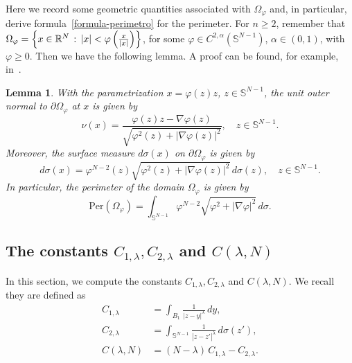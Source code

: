 \documentclass[10pt,reqno,english]{amsart}
\newcommand{\Sn}{\mathbb{S}^{N-1}}
\newcommand{\R} {\mathbb R}
\newtheorem{lemma}{Lemma}[section]
\theoremstyle{definition}
\numberwithin{equation}{section}
\begin{document}
Here we record some geometric quantities associated with $\Omega_\varphi$ and, in particular, derive formula~\eqref{formula-perimetro} for the perimeter. For $n\ge2$, remember that $\Omega_\varphi = \left\{ x \in \R^N \, : \, |x| < \varphi \left( {x \over |x|} \right) \right\}$, for some $\varphi \in C^{2, \alpha } (\mathbb S^{N-1})$, $\alpha \in (0,1)$, with $\varphi \geq 0$. Then we have the following lemma.
A proof can be found, for example, in~\cite[Proposition 4.1]{CFW}.

\begin{lemma}
\label{lemma:per}
 With the parametrization $x=\varphi(z)z$, $z\in\Sn$, the unit outer normal to $\partial\Omega_\varphi$ at $x$ is given by
 \[
 \nu(x)=\frac{\varphi(z)z-\nabla\varphi(z)}{ \sqrt{\varphi^2(z) + |\nabla \varphi(z) |^2} },\quad z\in\Sn.
 \]
 Moreover, the surface measure $d\sigma(x)$ on $\partial\Omega_\varphi$ is given by
 \[
 d\sigma(x)=\varphi^{N-2}(z) \sqrt{\varphi^2(z) + |\nabla \varphi(z) |^2} \, d\sigma(z),\quad z\in\Sn.
 \]
 In particular, the perimeter of the domain $\Omega_\varphi$ is given by
\[
{\mathrm{Per}} (\Omega_{\varphi })=\int_{\mathbb S^{N-1}} \varphi^{N-2} \sqrt{\varphi^2 + |\nabla \varphi |^2} \, d\sigma.
\]
\end{lemma}






\subsection{The constants \texorpdfstring{$C_{1,\lambda}, C_{2,\lambda}$ and $C(\lambda,N)$}{C1,lambda, C2,lambda and C(lambda,N)}}
\label{app:const}

In this section, we compute the constants $C_{1,\lambda}, C_{2,\lambda}$ and $C(\lambda,N) $. We recall they are defined as
\begin{align*}
C_{1,\lambda} &=\int_{B_1}\frac{1}{|z-y|^\lambda}\,dy,\\
C_{2, \lambda}&=\int_{\mathbb S^{N-1}}\frac{1}{|z-z'|^\lambda}\,d\sigma(z'),\\
 C(\lambda,N) &= (N-\lambda ) \, C_{1,\lambda} - C_{2,\lambda }.
\end{align*}
\end{document}
